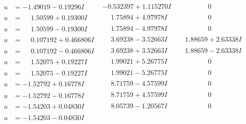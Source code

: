 \documentclass[1p]{elsarticle_modified}
\theoremstyle{definition}
\begin{document}
$$\begin{array}{c|c|c}
 \hline 
\begin{aligned}
u &= -1.49019 - 0.19296 I\end{aligned}
 & -0.532397 + 1.115270 I & \phantom{-0.000000 } 0 \\ \hline\begin{aligned}
u &= \phantom{-}1.50599 + 0.19300 I\end{aligned}
 & \phantom{-}1.75894 + 4.97978 I & \phantom{-0.000000 } 0 \\ \hline\begin{aligned}
u &= \phantom{-}1.50599 - 0.19300 I\end{aligned}
 & \phantom{-}1.75894 - 4.97978 I & \phantom{-0.000000 } 0 \\ \hline\begin{aligned}
u &= \phantom{-}0.107192 + 0.466806 I\end{aligned}
 & \phantom{-}3.69238 - 3.52663 I & \phantom{-}1.88659 + 2.63338 I \\ \hline\begin{aligned}
u &= \phantom{-}0.107192 - 0.466806 I\end{aligned}
 & \phantom{-}3.69238 + 3.52663 I & \phantom{-}1.88659 - 2.63338 I \\ \hline\begin{aligned}
u &= \phantom{-}1.52075 + 0.19227 I\end{aligned}
 & \phantom{-}1.99021 + 5.26775 I & \phantom{-0.000000 } 0 \\ \hline\begin{aligned}
u &= \phantom{-}1.52075 - 0.19227 I\end{aligned}
 & \phantom{-}1.99021 - 5.26775 I & \phantom{-0.000000 } 0 \\ \hline\begin{aligned}
u &= -1.52792 + 0.16778 I\end{aligned}
 & \phantom{-}8.71759 - 4.57599 I & \phantom{-0.000000 } 0 \\ \hline\begin{aligned}
u &= -1.52792 - 0.16778 I\end{aligned}
 & \phantom{-}8.71759 + 4.57599 I & \phantom{-0.000000 } 0 \\ \hline\begin{aligned}
u &= -1.54203 + 0.04830 I\end{aligned}
 & \phantom{-}8.05739 - 1.20567 I & \phantom{-0.000000 } 0 \\ \hline\begin{aligned}
u &= -1.54203 - 0.04830 I\end{aligned}

\end{array}$$
\end{document}
